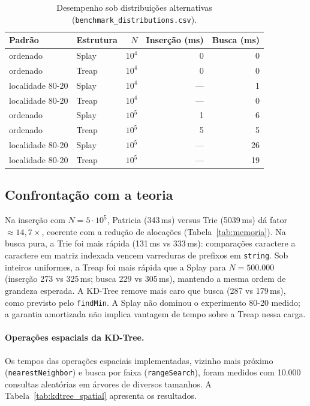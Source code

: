 \documentclass[11pt, a4paper]{article}
\begin{document}
\begin{table}[htbp]
\centering
\small
\begin{tabular}{@{}llrrr@{}}
\toprule
\textbf{Padrão} & \textbf{Estrutura} & \textbf{$N$} & \textbf{Inserção (ms)} & \textbf{Busca (ms)} \\ \midrule
ordenado & Splay & $10^{4}$ & 0 & 0 \\
ordenado & Treap & $10^{4}$ & 0 & 0 \\
localidade 80-20 & Splay & $10^{4}$ & --- & 1 \\
localidade 80-20 & Treap & $10^{4}$ & --- & 0 \\ \midrule
ordenado & Splay & $10^{5}$ & 1 & 6 \\
ordenado & Treap & $10^{5}$ & 5 & 5 \\
localidade 80-20 & Splay & $10^{5}$ & --- & 26 \\
localidade 80-20 & Treap & $10^{5}$ & --- & 19 \\
\bottomrule
\end{tabular}
\caption{Desempenho sob distribuições alternativas (\texttt{benchmark\_distributions.csv}).}
\label{tab:dist}
\end{table}

\subsection{Confrontação com a teoria}
Na inserção com $N=5\cdot10^{5}$, Patricia (343\,ms) versus Trie (5039\,ms) dá fator $\approx 14{,}7\times$, coerente com a redução de alocações (Tabela~\ref{tab:memoria}). Na busca pura, a Trie foi mais rápida (131\,ms vs 333\,ms): comparações caractere a caractere em matriz indexada vencem varreduras de prefixos em \texttt{string}. Sob inteiros uniformes, a Treap foi mais rápida que a Splay para $N=500.000$ (inserção 273 vs 325\,ms; busca 229 vs 305\,ms), mantendo a mesma ordem de grandeza esperada. A KD-Tree remove mais caro que busca (287 vs 179\,ms), como previsto pelo \texttt{findMin}. A Splay não dominou o experimento 80-20 medido; a garantia amortizada não implica vantagem de tempo sobre a Treap nessa carga.

\paragraph{Operações espaciais da KD-Tree.}
Os tempos das operações espaciais implementadas, vizinho mais próximo (\texttt{nearestNeighbor}) e busca por faixa (\texttt{rangeSearch}), foram medidos com 10.000 consultas aleatórias em árvores de diversos tamanhos. A Tabela~\ref{tab:kdtree_spatial} apresenta os resultados.
\end{document}
